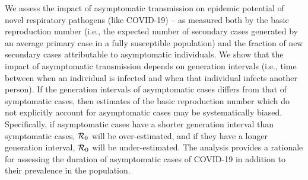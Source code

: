 {\footnotesize We assess the impact of asymptomatic transmission on epidemic potential of novel respiratory pathogens (like COVID-19) --
as measured both by the basic reproduction number (i.e., the expected number of secondary cases generated by an average primary case in a fully susceptible population) and the fraction of new secondary cases attributable to asymptomatic individuals. 
We show that the impact of asymptomatic transmission depends on generation intervals (i.e., time between when an individual is infected and when that individual infects another person).
If the generation intervals of asymptomatic cases differs from that of symptomatic cases, then estimates of the basic reproduction number which do not explicitly account for asymptomatic cases may be systematically biased. 
Specifically, if asymptomatic cases have a shorter generation interval than symptomatic cases, ${\cal{R}}_0$ will be over-estimated, and if they have a longer generation interval, ${\cal{R}}_0$ will be under-estimated.
The analysis provides a rationale for assessing the duration of asymptomatic cases of COVID-19 in addition to their prevalence in the population.
}
